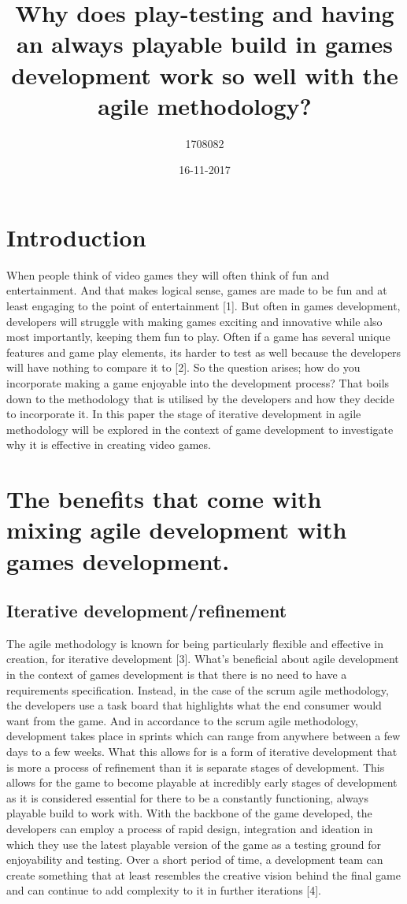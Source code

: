 \documentclass{article}
\title{Why does play-testing and having an always playable build in games development work so well with the agile methodology? }
\date{16-11-2017}
\author{1708082}
\begin{document}
\maketitle
\newpage
{}
 
\section{Introduction}
When people think of video games they will often think of fun and entertainment. And that makes logical sense, games are made to be fun and at least engaging to the point of entertainment [1]. But often in games development, developers will struggle with making games exciting and innovative while also most importantly, keeping them fun to play. Often if a game has several unique features and game play elements, its harder to test as well because the developers will have nothing to compare it to [2]. So the question arises; how do you incorporate making a game enjoyable into the development process? That boils down to the methodology that is utilised by the developers and how they decide to incorporate it. In this paper the stage of iterative development in agile methodology will be explored in the context of game development to investigate why it is effective in creating video games.
\section{The benefits that come with mixing agile development with games development.}
\subsection{Iterative development/refinement}
The agile methodology is known for being particularly flexible and effective in creation, for iterative development [3]. What's beneficial about agile development in the context of games development is that there is no need to have a requirements specification. Instead, in the case of the scrum agile methodology, the developers use a task board that highlights what the end consumer would want from the game. And in accordance to the scrum agile methodology, development takes place in sprints which can range from anywhere between a few days to a few weeks. What this allows for is a form of iterative development that is more a process of refinement than it is separate stages of development. This allows for the game to become playable at incredibly early stages of development as it is considered essential for there to be a constantly functioning, always playable build to work with. With the backbone of the game developed, the developers can employ a process of rapid design, integration and ideation in which they use the latest playable version of the game as a testing ground for enjoyability and testing. Over a short period of time, a development team can create something that at least resembles the creative vision behind the final game and can continue to add complexity to it in further iterations [4].
\end{document}
